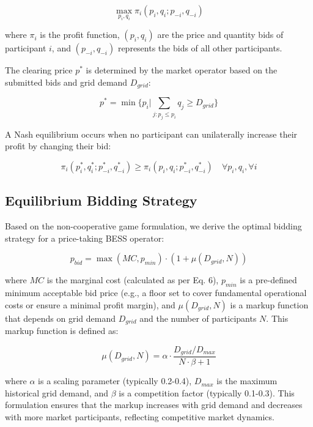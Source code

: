 \documentclass[11pt,a4paper]{article}
\begin{document}
\begin{equation}
\max_{p_i, q_i} \pi_i(p_i, q_i; p_{-i}, q_{-i})
\end{equation}

where $\pi_i$ is the profit function, $(p_i, q_i)$ are the price and quantity bids of participant $i$, and $(p_{-i}, q_{-i})$ represents the bids of all other participants.

The clearing price $p^*$ is determined by the market operator based on the submitted bids and grid demand $D_{grid}$:

\begin{equation}
p^* = \min\{p_i | \sum_{j: p_j \leq p_i} q_j \geq D_{grid}\}
\end{equation}

A Nash equilibrium occurs when no participant can unilaterally increase their profit by changing their bid:

\begin{equation}
\pi_i(p_i^*, q_i^*; p_{-i}^*, q_{-i}^*) \geq \pi_i(p_i, q_i; p_{-i}^*, q_{-i}^*) \quad \forall p_i, q_i, \forall i
\end{equation}

\subsection{Equilibrium Bidding Strategy}
Based on the non-cooperative game formulation, we derive the optimal bidding strategy for a price-taking BESS operator:

\begin{equation}
p_{bid} = \max(MC, p_{min}) \cdot (1 + \mu(D_{grid}, N))
\end{equation}

where $MC$ is the marginal cost (calculated as per Eq. 6), $p_{min}$ is a pre-defined minimum acceptable bid price (e.g., a floor set to cover fundamental operational costs or ensure a minimal profit margin), and $\mu(D_{grid}, N)$ is a markup function that depends on grid demand $D_{grid}$ and the number of participants $N$. This markup function is defined as:

\begin{equation}
\mu(D_{grid}, N) = \alpha \cdot \frac{D_{grid}/D_{max}}{N \cdot \beta + 1}
\end{equation}

where $\alpha$ is a scaling parameter (typically 0.2-0.4), $D_{max}$ is the maximum historical grid demand, and $\beta$ is a competition factor (typically 0.1-0.3). This formulation ensures that the markup increases with grid demand and decreases with more market participants, reflecting competitive market dynamics.
\end{document}
